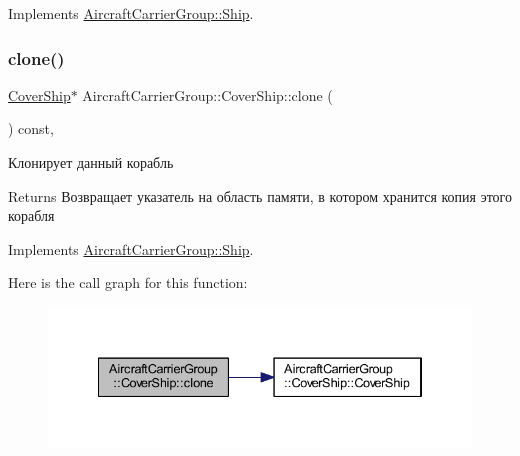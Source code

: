 Implements \mbox{\hyperlink{class_aircraft_carrier_group_1_1_ship_a9121f438c35ce54745ab1cab229be222}{Aircraft\+Carrier\+Group\+::\+Ship}}.

\mbox{\label{class_aircraft_carrier_group_1_1_cover_ship_aa6a5b007f5e05f9ad5cc300b8958309a}} 
\subsubsection{\texorpdfstring{clone()}{clone()}}
{\footnotesize\ttfamily \mbox{\hyperlink{class_aircraft_carrier_group_1_1_cover_ship}{Cover\+Ship}}$\ast$ Aircraft\+Carrier\+Group\+::\+Cover\+Ship\+::clone (\begin{DoxyParamCaption}{ }\end{DoxyParamCaption}) const\hspace{0.3cm}{\ttfamily [inline]}, {\ttfamily [virtual]}}



Клонирует данный корабль 

\begin{DoxyReturn}{Returns}
Возвращает указатель на область памяти, в котором хранится копия этого корабля 
\end{DoxyReturn}


Implements \mbox{\hyperlink{class_aircraft_carrier_group_1_1_ship_aec409c849026fa7d242fdd7de7ae9f02}{Aircraft\+Carrier\+Group\+::\+Ship}}.

Here is the call graph for this function\+:
\nopagebreak
\begin{figure}[H]
\begin{center}
\leavevmode
\includegraphics[width=334pt]{class_aircraft_carrier_group_1_1_cover_ship_aa6a5b007f5e05f9ad5cc300b8958309a_cgraph}
\end{center}
\end{figure}
\mbox{\label{class_aircraft_carrier_group_1_1_cover_ship_a3a08ec471959146e36e3d6c2fccf2159}} 

